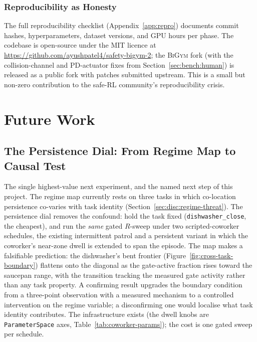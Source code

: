 \documentclass[11pt,a4paper]{report}
\newcommand{\bigym}{\textsc{BiGym}}
\begin{document}
\subsection{Reproducibility as Honesty}

The full reproducibility checklist (Appendix~\ref{app:repro})
documents commit hashes, hyperparameters, dataset versions, and
GPU hours per phase. The codebase is open-source under the MIT
licence at \url{https://github.com/ayushpatel4/safety-bigym-2}; the \bigym{} fork (with the
collision-channel and PD-actuator fixes from
Section~\ref{sec:bench:human}) is released as a public fork with
patches submitted upstream. This is a small but non-zero
contribution to the safe-RL community's reproducibility crisis.


\chapter{Future Work}
\label{ch:future}

\section{The Persistence Dial: From Regime Map to Causal Test}
\label{sec:fw:persistence-dial}

The single highest-value next experiment, and the named next step of
this project. The regime map currently rests on three tasks in which
co-location persistence co-varies with task identity
(Section~\ref{sec:disc:regime-threat}). The persistence dial removes
the confound: hold the task fixed (\texttt{dishwasher\_close}, the
cheapest), and run the \emph{same} gated $R$-sweep under two
scripted-coworker schedules, the existing intermittent patrol and a
persistent variant in which the coworker's near-zone dwell is
extended to span the episode. The map makes a falsifiable
prediction: the dishwasher's bent frontier
(Figure~\ref{fig:cross-task-boundary}) flattens onto the diagonal as
the gate-active fraction rises toward the saucepan range, with the
transition tracking the measured gate activity rather than any task
property. A confirming result upgrades the boundary condition from a
three-point observation with a measured mechanism to a controlled
intervention on the regime variable; a disconfirming one would
localise what task identity contributes. The infrastructure exists
(the dwell knobs are \texttt{ParameterSpace} axes,
Table~\ref{tab:coworker-params}); the cost is one gated sweep per
schedule.
\end{document}
